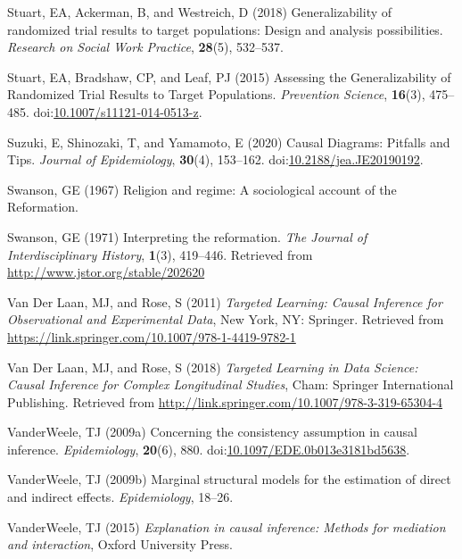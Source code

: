 \documentclass[
  single column]{article}
\newlength{\cslhangindent}
\newenvironment{CSLReferences}[2] %
 {\begin{list}{}{%
  \setlength{\itemindent}{0pt}
  \setlength{\leftmargin}{0pt}
  \setlength{\parsep}{0pt}
  \ifodd #1
   \setlength{\leftmargin}{\cslhangindent}
   \setlength{\itemindent}{-1\cslhangindent}
  \fi
  \setlength{\itemsep}{#2\baselineskip}}}
 {\end{list}}
\begin{document}
\begin{CSLReferences}{1}{0}
Stuart, EA, Ackerman, B, and Westreich, D (2018) Generalizability of
randomized trial results to target populations: Design and analysis
possibilities. \emph{Research on Social Work Practice}, \textbf{28}(5),
532--537.

Stuart, EA, Bradshaw, CP, and Leaf, PJ (2015) Assessing the
Generalizability of Randomized Trial Results to Target Populations.
\emph{Prevention Science}, \textbf{16}(3), 475--485.
doi:\href{https://doi.org/10.1007/s11121-014-0513-z}{10.1007/s11121-014-0513-z}.

Suzuki, E, Shinozaki, T, and Yamamoto, E (2020) Causal Diagrams:
Pitfalls and Tips. \emph{Journal of Epidemiology}, \textbf{30}(4),
153--162.
doi:\href{https://doi.org/10.2188/jea.JE20190192}{10.2188/jea.JE20190192}.

Swanson, GE (1967) Religion and regime: A sociological account of the
{R}eformation.

Swanson, GE (1971) Interpreting the reformation. \emph{The Journal of
Interdisciplinary History}, \textbf{1}(3), 419--446. Retrieved from
\url{http://www.jstor.org/stable/202620}

Van Der Laan, MJ, and Rose, S (2011) \emph{Targeted Learning: Causal
Inference for Observational and Experimental Data}, New York, NY:
Springer. Retrieved from
\url{https://link.springer.com/10.1007/978-1-4419-9782-1}

Van Der Laan, MJ, and Rose, S (2018) \emph{Targeted Learning in Data
Science: Causal Inference for Complex Longitudinal Studies}, Cham:
Springer International Publishing. Retrieved from
\url{http://link.springer.com/10.1007/978-3-319-65304-4}

VanderWeele, TJ (2009a) Concerning the consistency assumption in causal
inference. \emph{Epidemiology}, \textbf{20}(6), 880.
doi:\href{https://doi.org/10.1097/EDE.0b013e3181bd5638}{10.1097/EDE.0b013e3181bd5638}.

VanderWeele, TJ (2009b) Marginal structural models for the estimation of
direct and indirect effects. \emph{Epidemiology}, 18--26.

VanderWeele, TJ (2015) \emph{Explanation in causal inference: Methods
for mediation and interaction}, Oxford University Press.


\end{CSLReferences}
\end{document}
